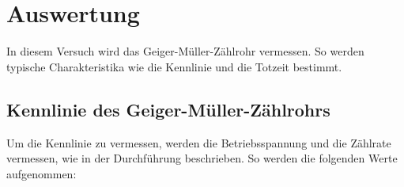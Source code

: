 


\section{Auswertung}
\label{sec:Auswertung}

In diesem Versuch wird das Geiger-Müller-Zählrohr vermessen. So werden typische Charakteristika wie die Kennlinie und 
die Totzeit bestimmt.

\subsection{Kennlinie des Geiger-Müller-Zählrohrs}
Um die Kennlinie zu vermessen, werden die Betriebsspannung und die Zählrate vermessen, wie in der Durchführung 
beschrieben. So werden die folgenden Werte aufgenommen:

